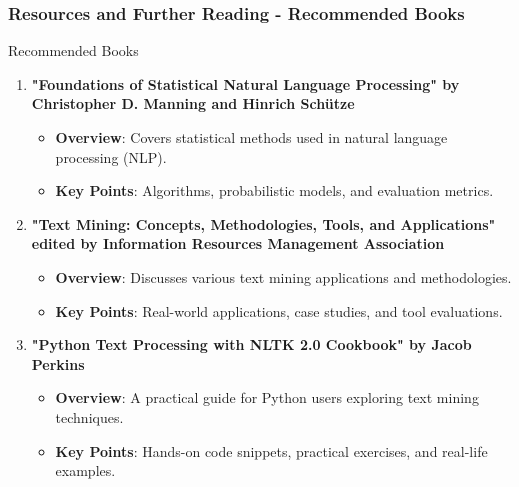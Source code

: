 \documentclass[aspectratio=169]{beamer}
\begin{document}
\begin{frame}[fragile]
    \frametitle{Resources and Further Reading - Recommended Books}
    \begin{block}{Recommended Books}
        \begin{enumerate}
            \item \textbf{"Foundations of Statistical Natural Language Processing" by Christopher D. Manning and Hinrich Schütze}
            \begin{itemize}
                \item \textbf{Overview}: Covers statistical methods used in natural language processing (NLP).
                \item \textbf{Key Points}: Algorithms, probabilistic models, and evaluation metrics.
            \end{itemize}
            
            \item \textbf{"Text Mining: Concepts, Methodologies, Tools, and Applications" edited by Information Resources Management Association}
            \begin{itemize}
                \item \textbf{Overview}: Discusses various text mining applications and methodologies.
                \item \textbf{Key Points}: Real-world applications, case studies, and tool evaluations.
            \end{itemize}
            
            \item \textbf{"Python Text Processing with NLTK 2.0 Cookbook" by Jacob Perkins}
            \begin{itemize}
                \item \textbf{Overview}: A practical guide for Python users exploring text mining techniques.
                \item \textbf{Key Points}: Hands-on code snippets, practical exercises, and real-life examples.
            \end{itemize}
        \end{enumerate}
    \end{block}
\end{frame}
\end{document}
